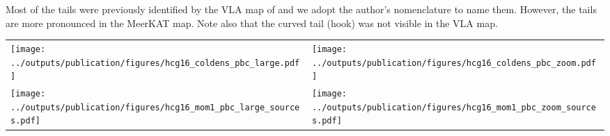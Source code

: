 \documentclass{aa}
\newcommand{\HI}{H\,{\sc i}}
\begin{document}
Most of the tails were previously identified 
by the VLA map of \citet{2019A&A...632A..78J} and we adopt the author's nomenclature to name them. However, the tails are more pronounced in the MeerKAT map. 
Note also that the curved tail (hook) was not visible in the VLA map.   
\begin{figure*}
\begin{tabular}{l l}
    \texttt{[image: ../outputs/publication/figures/hcg16\_coldens\_pbc\_large.pdf]}& 
    \texttt{[image: ../outputs/publication/figures/hcg16\_coldens\_pbc\_zoom.pdf]}\\
    \texttt{[image: ../outputs/publication/figures/hcg16\_mom1\_pbc\_large\_sources.pdf]} & 
    \texttt{[image: ../outputs/publication/figures/hcg16\_mom1\_pbc\_zoom\_sources.pdf]}  
\end{tabular}
\caption{\HI\ Moment maps of HCG 16. Left panels show all sources detected by SoFiA. The right panels show sources within the rectangular box 
shown on the left to better show the central part of the group. The top panels show the column density maps with contour levels of 
	(\SI{3.1e+18}{}, \SI{6.2e+18}{}, \SI{1.2e+18}{}, \SI{2.5e+19}{}, \SI{5.0e+19}{}, \SI{9.9e+19}{}, \SI{2.0e+20}{}) $\mathrm{cm^{-2}}$. 
    The contours are overlaid on DECaLS DR10 R-band optical images. The bottom panels show the moment one map. Each individual 
    source has its own color scaling and contour levels to highlight any rotational component.}
\label{fig:hcg16_mom}
\end{figure*}
\end{document}
